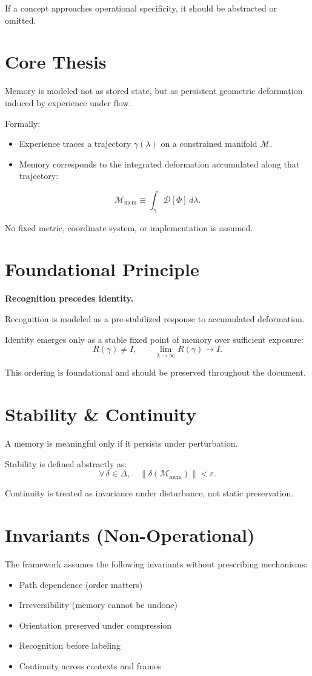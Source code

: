 \documentclass[11pt]{article}
\begin{document}
If a concept approaches operational specificity, it should be abstracted or omitted.

\section*{Core Thesis}
Memory is modeled not as stored state, but as persistent geometric deformation induced by experience under flow.

Formally:
\begin{itemize}
  \item Experience traces a trajectory $\gamma(\lambda)$ on a constrained manifold $\mathcal{M}$.
  \item Memory corresponds to the integrated deformation accumulated along that trajectory:
\end{itemize}

\[
  \mathcal{M}_{\mathrm{mem}} \equiv \int_{\gamma} \mathcal{D}[\Phi] \, d\lambda.
\]

No fixed metric, coordinate system, or implementation is assumed.

\section*{Foundational Principle}
\textbf{Recognition precedes identity.}

Recognition is modeled as a pre-stabilized response to accumulated deformation.

Identity emerges only as a stable fixed point of memory over sufficient exposure:
\[
  R(\gamma) \neq I, \qquad \lim_{\lambda \to \infty} R(\gamma) \to I.
\]

This ordering is foundational and should be preserved throughout the document.

\section*{Stability \& Continuity}
A memory is meaningful only if it persists under perturbation.

Stability is defined abstractly as:
\[
  \forall\, \delta \in \Delta, \quad \lVert \delta(\mathcal{M}_{\mathrm{mem}}) \rVert < \varepsilon.
\]

Continuity is treated as invariance under disturbance, not static preservation.

\section*{Invariants (Non-Operational)}
The framework assumes the following invariants without prescribing mechanisms:
\begin{itemize}
  \item Path dependence (order matters)
  \item Irreversibility (memory cannot be undone)
  \item Orientation preserved under compression
  \item Recognition before labeling
  \item Continuity across contexts and frames
\end{itemize}
\end{document}
